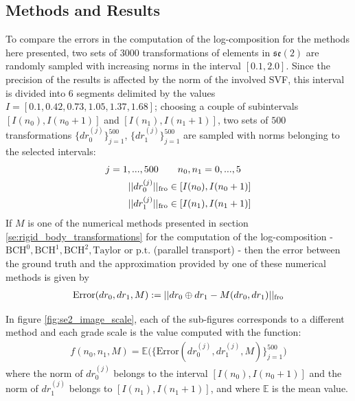 \subsection{Methods and Results}

To compare the errors in the computation of the log-composition for the methods here presented, two sets of $3000$ transformations of elements in $\mathfrak{se}(2)$ are randomly sampled with increasing norms in the interval $[0.1, 2.0]$. Since the precision of the results is affected by the norm of the involved SVF, this interval is divided into 6 segments delimited by the values $I = [0.1, 0.42, 0.73, 1.05, 1.37, 1.68 ]$; choosing a couple of subintervals $[I(n_0), I(n_0+1)]$ and $[I(n_1), I(n_1+1)]$, two sets of $500$ transformations $\{ dr_{0}^{(j)}\}_{j=1}^{500}$, $\{ dr_{1}^{(j)} \}_{j=1}^{500}$ are sampled with norms belonging to the selected intervals:
\begin{align*}
j=1,...,500 \quad &\quad  n_0, n_1 = 0,...,5 \\
\vert\lvert dr_{0}^{(j)} \rvert\vert_{\text{fro}} &\in [I(n_0), I(n_0+1)] \\
\vert\lvert dr_{1}^{(j)} \rvert\vert_{\text{fro}} &\in [I(n_1), I(n_1+1)]  
\end{align*} 
If $M$ is one of the numerical methods presented in section \ref{se:rigid_body_transformations} for the computation of the log-composition - $\text{BCH}^{0}, \text{BCH}^{1}, \text{BCH}^{2}, \text{Taylor}$ or $\text{p.t.}$ (parallel transport) - 
then the error between the ground truth and the approximation provided by one of these numerical methods is given by
\begin{align*}
\text{Error}(dr_{0},dr_{1},M) 
:= 
\vert\lvert dr_{0} \oplus dr_{1}
- 
M(dr_{0}, dr_{1})  \rvert\vert_{\text{fro}} 
\end{align*}

In figure \ref{fig:se2_image_scale}, each of the sub-figures corresponds to a different method and each grade scale is the value computed with the function:
\begin{align*}
f(n_0,n_1,M) 
=
 \mathbb{E}\Big(
  \{ 
  \text{Error}(dr_{0}^{(j)},dr_{1}^{(j)}, M) 
  \}_{j=1}^{500}
  \Big)
\end{align*}
where the norm of $dr_{0}^{(j)}$ belongs to the interval $[I(n_0), I(n_0+1)]$ and the norm of 
$dr_{1}^{(j)}$ belongs to $[I(n_1), I(n_1+1)]$, and where $\mathbb{E}$ is the mean value.

